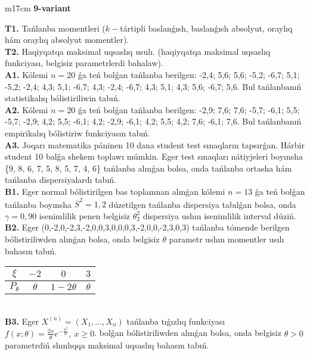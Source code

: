 \documentclass{article}
\begin{document}
\begin{tabular}{m{17cm}}
\textbf{9-variant}
\newline

\textbf{T1.} 
Tańlanba momentleri (\(k -\)tártipli baslanǵısh, baslanǵısh absolyut, oraylıq hám oraylıq absolyut momentler).
 \\
\textbf{T2.} 
Haqiyqatqa maksimal uqsaslıq usulı. (haqiyqatqa maksimal uqsaslıq funkciyası, belgisiz parametrlerdi bahalaw).
 \\
\textbf{A1.} 
Kólemi \(n = 20\) ǵa teń bolǵan tańlanba berilgen: -2,4; 5,6; 5,6; -5,2; -6,7; 5,1; -5,2; -2,4; 4,3; 5,1; -6,7; 4,3; -2,4; -6,7; 4,3; 5,1; 4,3; 5,6; -6,7; 5,6. Bul tańlanbanıń statistikalıq bólistiriliwin tabıń.
 \\
\textbf{A2.} 
Kólemi \(n = 20\) ǵa teń bolǵan tańlanba berilgen: -2,9; 7,6; 7,6; -5,7; -6,1; 5,5; -5,7; -2,9; 4,2; 5,5; -6,1; 4,2; -2,9; -6,1; 4,2; 5,5; 4,2; 7,6; -6,1; 7,6. Bul tańlanbanıń empirikalıq bólistiriw funkciyasın tabıń.
 \\
\textbf{A3.} 
Joqarı matematika páninen 10 dana student test sınaqların tapsırǵan. Hárbir student 10 balǵa shekem toplawı múmkin. Eger test sınaqları nátiyjeleri boyınsha \{9, 8, 6, 7, 5, 8, 5, 7, 4, 6\} tańlanba alınǵan bolsa, onda tańlanba ortasha hám tańlanba dispersiyalardı tabıń.
 \\
\textbf{B1.} 
Eger normal bólistirilgen bas toplamnan alınǵan kólemi \(n = 13\) ǵa teń bolǵan tańlanba boyınsha \({\overline{S}}^{2} = 1,2\) dúzetilgen tańlanba dispersiya tabılǵan bolsa, onda \(\gamma = 0,90\) isenimlilik penen belgisiz \(\theta_{2}^{2}\) dispersiya ushın isenimlilik interval dúziń.
 \\
\textbf{B2.} 
Eger (0,-2,0,-2,3,-2,0,0,3,0,0,0,3,-2,0,0,-2,3,0,3) tańlanba tómende berilgen bólistiriliwden alınǵan bolsa, onda belgisiz \(\theta\) parametr ushın momentler usılı bahasın tabıń.
\begin{tabular}{|c|c|c|c|}
  \hline
$\xi$ & $- 2$  & $0$  & $3$ \\
\hline
\(P_{\theta}\) & \(\theta\) & \(1 - 2\theta\) & \(\theta\) \\
\hline
\end{tabular}
 \\
\textbf{B3.} 
Eger \(X^{(n)} = \left( X_{1},...,X_{n} \right)\) tańlanba tıǵızlıq funkciyası \(f(x;\theta) = \frac{2x}{\theta}e^{- \frac{x^{2}}{\theta}},\ x \geq 0\). bolǵan bólistiriliwden alınǵan bolsa, onda belgisiz \(\theta > 0\) parametrdiń shınlıqqa maksimal uqsaslıq bahasın tabıń.
 \\

\end{tabular}
\end{document}
